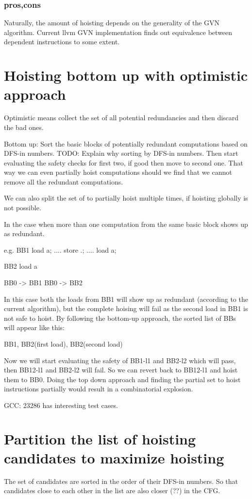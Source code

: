 \documentclass{sig-alternate}
\begin{document}
\subsubsection{pros,cons}
Naturally, the amount of hoisting depends on the generality of the GVN
algorithm. Current llvm GVN implementation finds out equivalence between
dependent instructions to some extent.


\section{Hoisting bottom up with optimistic approach}
Optimistic means collect the set of all potential redundancies and
then discard the bad ones.

Bottom up: Sort the basic blocks of potentially redundant computations
based on DFS-in numbers.  TODO: Explain why sorting by DFS-in numbers.
Then start evaluating the safety checks for first two, if good then
move to second one. That way we can even partially hoist computations
should we find that we cannot remove all the redundant computations.

We can also split the set of to partially hoist multiple times, if
hoisting globally is not possible.

In the case when more than one computation from the same basic block
shows up as redundant.

e.g.
BB1
load a;
....
store .;
....
load a;


BB2
load a

BB0 -> BB1
BB0 -> BB2

In this case both the loads from BB1 will show up as redundant
(according to the current algorithm), but the complete hoising will
fail as the second load in BB1 is not safe to hoist. By following the
bottom-up approach, the sorted list of BBs will appear like this:

{ BB1, BB2(first load), BB2(second load) }

Now we will start evaluating the safety of BB1-l1 and BB2-l2 which
will pass, then BB12-l1 and BB2-l2 will fail.  So we can revert back
to BB12-l1 and hoist them to BB0. Doing the top down approach and
finding the partial set to hoist instructions partially would result
in a combinatorial explosion.

GCC: 23286 has interesting test cases.

\section{Partition the list of hoisting candidates to maximize hoisting}
\cite{sec:partition}
The set of candidates are sorted in the order of their DFS-in
numbers. So that candidates close to each other in the list are also
closer (??) in the CFG.
\end{document}
